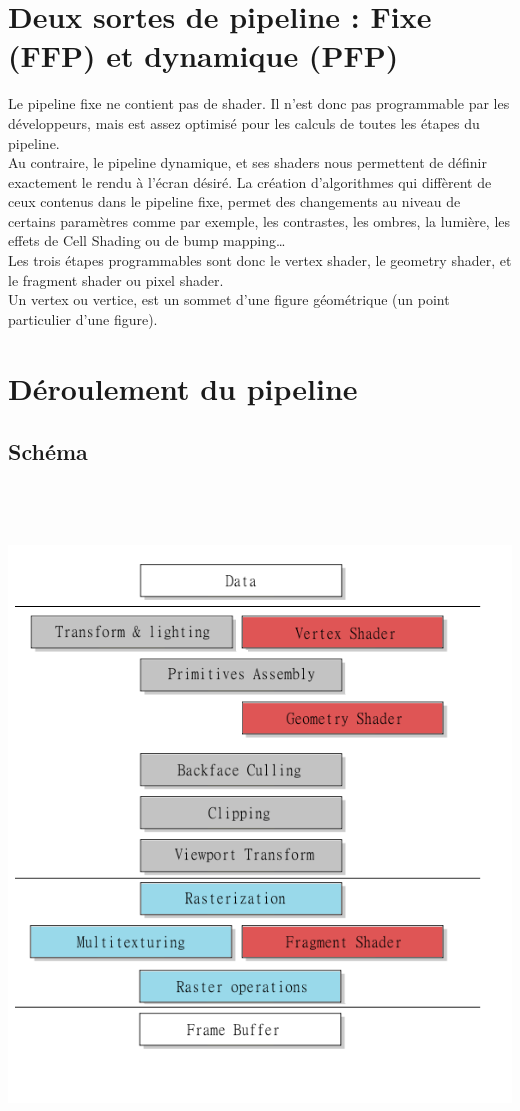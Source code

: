 \section{Deux sortes de pipeline : Fixe (FFP) et dynamique (PFP)}
Le pipeline fixe ne contient pas de shader. Il n’est donc pas programmable par les développeurs, mais est assez optimisé pour les calculs de toutes les étapes du pipeline.
\\
Au contraire, le pipeline dynamique, et ses shaders nous permettent de définir exactement le rendu à l’écran désiré. La création d’algorithmes qui diffèrent de ceux contenus dans le pipeline fixe, permet des changements au niveau de certains paramètres comme par exemple, les contrastes, les ombres, la lumière, les effets de Cell Shading ou de bump mapping…
\\
Les trois étapes programmables sont donc le vertex shader, le geometry shader, et le fragment shader ou pixel shader.
\\
Un vertex ou vertice, est un sommet d’une figure géométrique (un point particulier d’une figure).

\section{Déroulement du pipeline}
\subsection{Schéma}
\includegraphics[width=14cm,height=180mm]{leo/images/pipeline.png}
